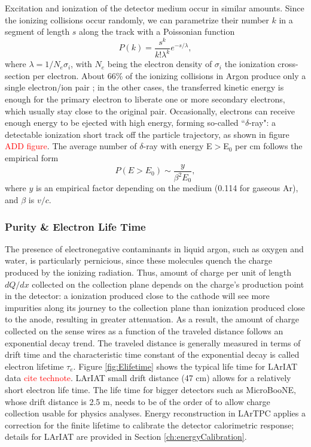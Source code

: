 Excitation and ionization of the detector medium occur in similar amounts. Since the ionizing collisions occur randomly, we can parametrize their number $k$ in a segment of length $s$ along the track  with a Poissonian function
\begin{equation}
P(k) = \frac{s^k}{k! \lambda^k} e^{-s/ \lambda }, 
\end{equation}
where $\lambda = 1/N_{e}\sigma_i$, with $N_{e}$ being the electron density of $\sigma_i$ the ionization cross-section per electron.  About 66\% of the ionizing collisions in Argon produce only a single electron/ion pair \cite{0034-4885-73-11-116201}; in the other cases, the transferred kinetic energy is enough for the primary electron to liberate one or more secondary electrons, which usually stay close to the original pair.  
Occasionally, electrons can receive enough energy to be ejected with high energy, forming so-called ``$\delta$-ray": a detectable ionization short track off the particle trajectory, as shown in figure \textcolor{red}{ADD figure}. 
The average number of $\delta$-ray  with energy E$>$E$_0$ per cm follows the empirical form
\begin{equation}
P(E>E_0) \sim \frac{y}{\beta^2 E_0},
\end{equation}
where $y$ is an empirical factor depending on the medium (0.114 for  gaseous Ar), and $\beta$ is $v/c$.


		
\subsubsection{Purity \& Electron Life Time }
The presence of electronegative contaminants in liquid argon, such as oxygen and water, is particularly
pernicious, since these molecules quench the charge produced by the ionizing radiation.  Thus, amount of charge per unit of length $dQ/dx$ collected on the collection plane depends on the charge's production point in the detector: a ionization produced  close to the cathode will see more impurities along its journey to the collection plane than ionization produced close to the anode, resulting in greater attenuation. As a result,  the amount of charge collected on the sense wires as a function of the traveled distance follows an exponential decay trend. The traveled distance is generally measured in terms of drift time and the  characteristic time constant of the exponential decay is called electron lifetime $\tau_e$. Figure \ref{fig:Elifetime} shows the typical life time for LArIAT data \textcolor{red}{cite technote}. LArIAT small drift distance (47 cm) allows for a relatively short electron life time. The life time for bigger detectors such as MicroBooNE, whose drift distance is 2.5 m, needs to be of the order of  to allow charge collection usable for physics analyses. Energy reconstruction in LArTPC applies a correction for the finite lifetime to calibrate the detector calorimetric response; details for LArIAT are provided in Section \ref{ch:energyCalibration}.

